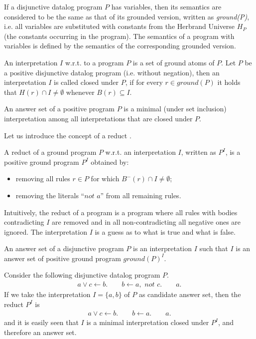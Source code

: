 If a disjunctive datalog program $P$ has variables, then its semantics are considered to be the same as that of its grounded version, written as \textit{ground(P)}, i.e. all variables are substituted with constants from the Herbrand Universe $H_P$ (the constants occurring in the program). The semantics of a program with variables is defined by the semantics of the corresponding grounded version.

An interpretation $I$ w.r.t. to a program $P$ is a set of ground atoms of $P$. Let $P$ be a positive disjunctive datalog program (i.e. without negation), then an interpretation $I$ is called closed under $P$, if for every $r \in \textit{ground}(P)$ it holds that $H(r) \cap I \ne \emptyset$ whenever $B(r) \subseteq I$. 
\begin{definition}
An answer set of a positive program $P$ is a minimal (under set inclusion) interpretation among all interpretations that are closed under $P$.
\end{definition}

Let us introduce the concept of a reduct \parencite{DBLP:conf/aaai/Lifschitz08}.
\begin{definition} 
A reduct of a ground program $P$ w.r.t. an interpretation $I$, written as $P^I$, is  a positive ground program $P^I$ obtained by: 
\begin{itemize}
   \item removing all rules $r \in P$ for which $B^{-}(r) \cap I \ne \emptyset$;
   \item removing the literals ``$\textit{not }a$'' from all remaining rules.
 \end{itemize}
\end{definition}
Intuitively, the reduct of a program is a program where all rules with bodies contradicting $I$ are removed and in all non-contradicting all negative ones are ignored. The interpretation $I$ is a guess as to what is true and what is false.

\begin{definition}
An answer set of a disjunctive program $P$ is an interpretation $I$ such that $I$ is an answer set of positive ground program $\textit{ground}(P)^I$. 
\end{definition}

\begin{example} Consider the following disjunctive datalog program $P$.
  \begin{eqnarray*}
    a \vee c  \leftarrow  b. \quad \quad b  \leftarrow  a, \textit{ not }c. \quad \quad a.
  \end{eqnarray*}
If we take the interpretation $I=\{a,b\}$ of $P$ as candidate answer set, then the reduct $P^I$ 
is  
\begin{eqnarray*}
    a \vee c \leftarrow b. \quad \quad   b \leftarrow a. \quad \quad  a.
\end{eqnarray*}
and it is easily seen that $I$ is a minimal interpretation closed under $P^I$, and therefore an answer set. 
\end{example}

